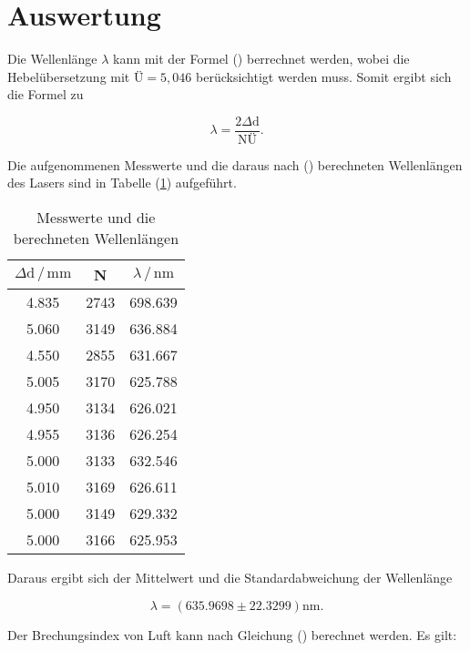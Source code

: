 \newpage
\section{Auswertung}
Die Wellenlänge $\lambda$ kann mit der Formel () berrechnet werden, 
wobei die Hebelübersetzung mit $\text{Ü}=5,046$ berücksichtigt werden muss.
Somit ergibt sich die Formel zu

\begin{equation}
\lambda=\frac{2 \Delta \text{d}}{ \text{NÜ}} .
\label{eqn:lam}
\end{equation}

\noindent
Die aufgenommenen Messwerte und die daraus nach () berechneten Wellenlängen des Lasers sind in Tabelle (\ref{tab:lam}) aufgeführt.

\begin{table}
    \centering
    \caption{Messwerte und die berechneten Wellenlängen}
    \label{tab:lam}
    \begin{tabular}{c c c}
    \toprule
    $ \Delta \text{d} \,/\, \si{\milli\meter} $ & N & $\lambda \,/\, \si{\nano\meter}$\\
    \midrule 
   
    4.835  & 2743 &  698.639 \\
    5.060  & 3149 &  636.884 \\
    4.550  & 2855 &  631.667 \\
    5.005  & 3170 &  625.788 \\
    4.950  & 3134 &  626.021 \\
    4.955  & 3136 &  626.254 \\
    5.000  & 3133 &  632.546 \\
    5.010  & 3169 &  626.611 \\
    5.000  & 3149 &  629.332 \\
    5.000  & 3166 &  625.953 \\

    \bottomrule
    \end{tabular}
  \end{table}

\noindent
Daraus ergibt sich der Mittelwert und die Standardabweichung der Wellenlänge

\begin{equation*}
\lambda = (635.9698 \pm 22.3299) \si{\nano\meter}.
\end{equation*}

\noindent
Der Brechungsindex von Luft kann nach Gleichung () berechnet werden.
Es gilt:

